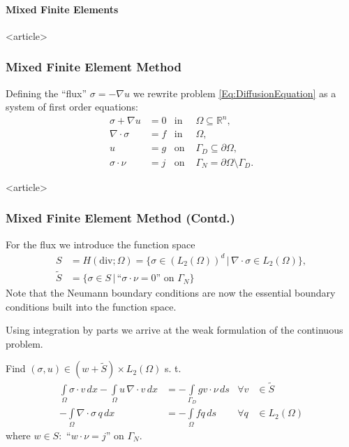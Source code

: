 \paragraph{Mixed Finite Elements}

\begin{frame}<article>
\frametitle<presentation>{Mixed Finite Element Method}
Defining the ``flux'' $\sigma=-\nabla u$ we rewrite problem
\eqref{Eq:DiffusionEquation} as a system of first order equations:
\begin{subequations}
\label{Eq:DiffusionEquationMixedForm}
\begin{align*}
\sigma + \nabla u &= 0 & \text{in }& \Omega\subseteq\mathbb{R}^n,\\
\nabla \cdot \sigma     &= f & \text{in }& \Omega,\\
                      u &= g& \text{on }& \Gamma_D\subseteq\partial\Omega,\\
        \sigma\cdot\nu  &= j& \text{on }& \Gamma_N=\partial\Omega\setminus\Gamma_D.
\end{align*}
\end{subequations}
\end{frame}

\begin{frame}<article>
\frametitle<presentation>{Mixed Finite Element Method (Contd.)}
For the flux we introduce the function space
\begin{subequations}
\begin{align*}
S &= H(\text{div};\Omega) = \{\sigma\in \left(L_2(\Omega)\right)^d \,|\,
\nabla\cdot \sigma \in L_2(\Omega)\},\\
\tilde{S} &= \{\sigma\in S \,|\, \text{``$\sigma\cdot\nu=0$'' on $\Gamma_N$} \}
\end{align*}
\end{subequations}
Note that the Neumann boundary conditions are now the essential
boundary conditions built into the function space.  

Using integration by parts we arrive at the weak formulation of the continuous problem.

Find $(\sigma,u)\in (w+\tilde{S})\times L_2(\Omega)$ s. t.
\begin{align*}
\int\limits_\Omega \sigma\cdot v \, dx  -\int\limits_\Omega
u \, \nabla\cdot v \, dx & =  
-\int\limits_{\Gamma_D} g v\cdot \nu \, ds 
& \forall v &\in \tilde{S}\\
- \int\limits_\Omega \nabla\cdot\sigma \, q \, dx      &= 
- \int\limits_\Omega f q \, ds &
\forall q &\in L_2(\Omega)
\end{align*}
where $w\in S :$ ``$w\cdot\nu = j$'' on $\Gamma_N$.
\end{frame}

